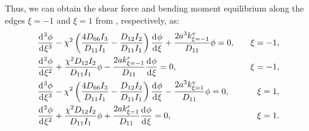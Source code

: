 \documentclass[preprint,12pt,number]{elsarticle}
\newcommand{\id}{\mathrm{d}\mkern1mu}
\begin{document}
%
Thus, we can obtain the shear force and bending moment equilibrium along the edges $\xi = -1$ and $\xi = 1$ from , respectively, as:
%
\begin{subequations}\label{eq:boundaryx}
\begin{align}
	&  \frac{\id^3 \phi}{\id \xi^3} - \chi^2\left( \frac{4D_{66}I_3}{D_{11}I_1}  - \frac{D_{12}I_2}{D_{11}I_1}  \right) \frac{\id \phi}{\id \xi} 
	+\frac{2a^3k^v_{\xi=-1}}{D_{11}}\phi = 0, \quad &\xi = -1, \\
	& \frac{\id^2 \phi}{\id \xi^2} + \frac{\chi^2 D_{12} I_2}{D_{11} I_1} \phi - \frac{2a k^r_{\xi=-1}}{D_{11}} \frac{\id \phi}{\id \xi} = 0, \quad &\xi = -1, \\
	& \frac{\id^3 \phi}{\id \xi^3} - \chi^2\left( \frac{4D_{66}I_3}{D_{11}I_1}  - \frac{D_{12}I_2}{D_{11}I_1}  \right) \frac{\id \phi}{\id \xi} 
	-\frac{2a^3 k^v_{\xi=1}}{D_{11}} \phi = 0, \quad &\xi = 1, \\
	& \frac{\id^2 \phi}{\id \xi^2} + \frac{\chi^2 D_{12} I_2}{D_{11} I_1} \phi + \frac{2a k^r_{\xi=1}}{D_{11}} \frac{\id \phi}{\id \xi} = 0, \quad &\xi = 1.
\end{align}
\end{subequations}
\end{document}
